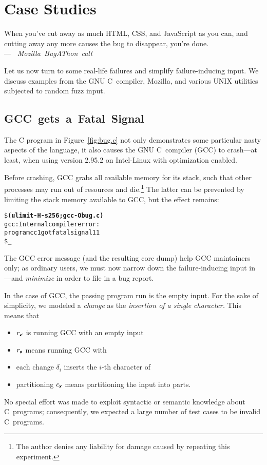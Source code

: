 \documentclass{acm_proc_article-sp}
\newcommand{\CSS}        {{\small CSS}\xspace}
\newcommand{\GNU}        {{\small GNU}\xspace}
\newcommand{\GCC}        {{\small GCC}\xspace}
\newcommand{\HTML}       {{\small HTML}\xspace}
\newcommand{\UNIX}       {{\small UNIX}\xspace}
\newcommand{\PASS}{\text{\ding{52}}\xspace}
\newcommand{\FAIL}{\text{\ding{56}}\xspace}
\newcommand{\rpass}{{r_{\scriptscriptstyle \PASS}}}
\newcommand{\rfail}{{r_{\scriptscriptstyle \FAIL}}}
\newcommand{\cfail}{{c_{\scriptscriptstyle \FAIL}}}
\newcommand{\codeid}[1]{\text{\upshape\texttt{#1}}}
\def\<#1>{\codeid{#1}}
\newenvironment{Quote}{%
\smallskip
\begin{minipage}[t]{\columnwidth}
\begin{flushright}%
\itshape%
\samepage%
}{\end{flushright}\end{minipage}\par}
\newcommand{\By}[2]{\\[1mm]---~\mbox{\textnormal{#1}} \mbox{\textsl{#2}}}
\theoremstyle{plain}
\let\oldfootnote=\footnote
\renewcommand{\footnote}[1]{\oldfootnote{\let\small=\scriptsize #1}}
\begin{document}
\section{Case Studies}
\label{sec:ddmin-case-studies}

\begin{Quote}
  When you've cut away as much \HTML, \CSS, and JavaScript as you can, and
  cutting away any more causes the bug to disappear, you're done.
  \By{}{Mozilla BugAThon call}
\end{Quote}

Let us now turn to some real-life failures and simplify
failure-inducing input.  We discuss examples from the \GNU C~compiler,
Mozilla, and various \UNIX utilities subjected to random fuzz input.

\subsection{GCC~gets~a~Fatal~\mbox{Signal}}
\label{sec:gcc}

\noindent
The C program in Figure~\ref{fig:bug.c} not only demonstrates some
particular nasty aspects of the language, it also causes the \GNU
C~compiler (\GCC) to crash---at least, when using version 2.95.2 on
Intel-Linux with optimization enabled.

Before crashing, \GCC grabs all available memory for its stack, such
that other processes may run out of resources and die.\footnote{The
  author denies any liability for damage caused by repeating this
  experiment.}  The latter can be prevented by limiting the stack
memory available to \GCC, but the effect remains:

\begin{alltt}\small\ttfamily
\$ \textbf{(ulimit -H -s 256; gcc -O bug.c)}
gcc: Internal compiler error:
     program cc1 got fatal signal 11
\$ _
\end{alltt}

\noindent
The \GCC error message (and the resulting core dump) help \GCC
maintainers only; as ordinary users, we must now narrow down the
failure-inducing input in \<bug.c>---and \emph{minimize} \<bug.c> in
order to file in a bug report.

In the case of \GCC, the passing program run is the empty input.  For
the sake of simplicity, we modeled a \emph{change} as the
\emph{insertion of a single character.}  This means that
\begin{itemize}
\item $\rpass$ is running \GCC with an empty input
\item $\rfail$ means running \GCC with~\<bug.c>
\item each change $\delta_i$ inserts the $i$-th character of \<bug.c>
\item partitioning $\cfail$ means partitioning the input into parts.
\end{itemize}
No special effort was made to exploit syntactic or semantic knowledge
about C~programs; consequently, we expected a large number of test
cases to be invalid C~programs.
\end{document}
